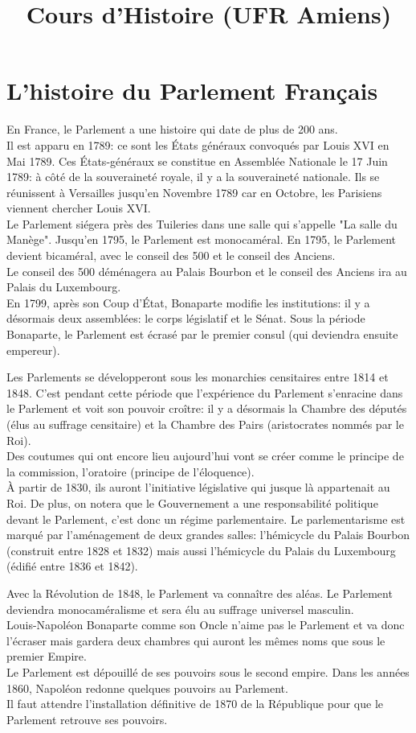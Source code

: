 \documentclass[12pt, a4paper, openany]{book}
\date{}
\title{Cours d'Histoire (UFR Amiens)}
\begin{document}
\tableofcontents

\section{L'histoire du Parlement Français}

En France, le Parlement a une histoire qui date de plus de 200 ans. \\
Il est apparu en 1789: ce sont les États généraux convoqués par Louis XVI en Mai 1789. Ces États-généraux se constitue en Assemblée Nationale le 17 Juin 1789: à côté de la souveraineté royale, il y a la souveraineté nationale. Ils se réunissent à Versailles jusqu'en Novembre 1789 car en Octobre, les Parisiens viennent chercher Louis XVI. \\
Le Parlement siégera près des Tuileries dans une salle qui s'appelle "La salle du Manège". Jusqu'en 1795, le Parlement est monocaméral. En 1795, le Parlement devient bicaméral, avec le conseil des 500 et le conseil des Anciens. \\
Le conseil des 500 déménagera au Palais Bourbon et le conseil des Anciens ira au Palais du Luxembourg. \\
En 1799, après son Coup d'État, Bonaparte modifie les institutions: il y a désormais deux assemblées: le corps législatif et le Sénat. Sous la période Bonaparte, le Parlement est écrasé par le premier consul (qui deviendra ensuite empereur).


Les Parlements se développeront sous les monarchies censitaires entre 1814 et 1848. C'est pendant cette période que l'expérience du Parlement s'enracine dans le Parlement et voit son pouvoir croître: il y a désormais la Chambre des députés (élus au suffrage censitaire) et la Chambre des Pairs (aristocrates nommés par le Roi). \\ 
Des coutumes qui ont encore lieu aujourd'hui vont se créer comme le principe de la commission, l'oratoire (principe de l'éloquence). \\
À partir de 1830, ils auront l'initiative législative qui jusque là appartenait au Roi. De plus, on notera que le Gouvernement a une responsabilité politique devant le Parlement, c'est donc un régime parlementaire. Le parlementarisme est marqué par l'aménagement de deux grandes salles: l'hémicycle du Palais Bourbon (construit entre 1828 et 1832) mais aussi l'hémicycle du Palais du Luxembourg (édifié entre 1836 et 1842).


Avec la Révolution de 1848, le Parlement va connaître des aléas. Le Parlement deviendra monocaméralisme et sera élu au suffrage universel masculin.\\
Louis-Napoléon Bonaparte comme son Oncle n'aime pas le Parlement et va donc l'écraser mais gardera deux chambres qui auront les mêmes noms que sous le premier Empire. \\
Le Parlement est dépouillé de ses pouvoirs sous le second empire. Dans les années 1860, Napoléon redonne quelques pouvoirs au Parlement. \\
Il faut attendre l'installation définitive de 1870 de la République pour que le Parlement retrouve ses pouvoirs.
\end{document}
